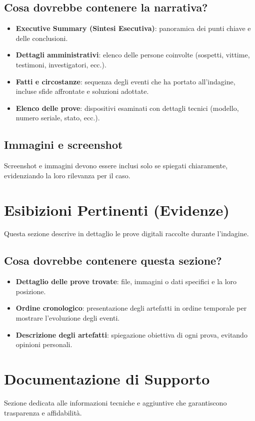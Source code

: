 \documentclass[a4paper,12pt]{report}
\begin{document}
\subsection{Cosa dovrebbe contenere la narrativa?}
\begin{itemize}
    \item \textbf{Executive Summary (Sintesi Esecutiva)}: panoramica dei punti chiave e delle conclusioni.
    \item \textbf{Dettagli amministrativi}: elenco delle persone coinvolte (sospetti, vittime, testimoni, investigatori, ecc.).
    \item \textbf{Fatti e circostanze}: sequenza degli eventi che ha portato all'indagine, incluse sfide affrontate e soluzioni adottate.
    \item \textbf{Elenco delle prove}: dispositivi esaminati con dettagli tecnici (modello, numero seriale, stato, ecc.).
\end{itemize}

\subsection{Immagini e screenshot}
Screenshot e immagini devono essere inclusi solo se spiegati chiaramente, evidenziando la loro rilevanza per il caso.

\section{Esibizioni Pertinenti (Evidenze)}
Questa sezione descrive in dettaglio le prove digitali raccolte durante l'indagine.

\subsection{Cosa dovrebbe contenere questa sezione?}
\begin{itemize}
    \item \textbf{Dettaglio delle prove trovate}: file, immagini o dati specifici e la loro posizione.
    \item \textbf{Ordine cronologico}: presentazione degli artefatti in ordine temporale per mostrare l'evoluzione degli eventi.
    \item \textbf{Descrizione degli artefatti}: spiegazione obiettiva di ogni prova, evitando opinioni personali.
\end{itemize}

\section{Documentazione di Supporto}
Sezione dedicata alle informazioni tecniche e aggiuntive che garantiscono trasparenza e affidabilità.
\end{document}
